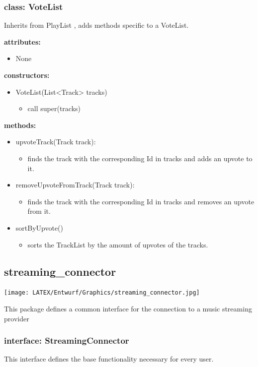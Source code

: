 \documentclass[oneside, ngerman]{sdqtechreport}
\begin{document}
\subsubsection{class: VoteList}
Inherits from PlayList , adds methods specific to a VoteList.

\textbf{attributes:}
\begin{itemize}
    \item None
\end{itemize}
\textbf{constructors:}
\begin{itemize}
    \item VoteList(List<Track> tracks)
    \begin{itemize}
        \item call super(tracks)
    \end{itemize}
\end{itemize}
\textbf{methods:}
\begin{itemize}
    \item upvoteTrack(Track track):
    \begin{itemize}
        \item finds the track with the corresponding Id in tracks and adds an upvote to it.
    \end{itemize}
    \item removeUpvoteFromTrack(Track track):
    \begin{itemize}
        \item finds the track with the corresponding Id in tracks and removes an upvote from it.
    \end{itemize}
    \item sortByUpvote()
    \begin{itemize}
        \item sorts the TrackList by the amount of upvotes of the tracks.
    \end{itemize}
\end{itemize}

\subsection{streaming\_connector}
\begin{center}
   \texttt{[image: LATEX/Entwurf/Graphics/streaming\_connector.jpg]} 
\end{center}
This package defines a common interface for the connection to a music streaming provider

\subsubsection{interface: StreamingConnector}
This interface defines the base functionality necessary for every user. 
\end{document}

